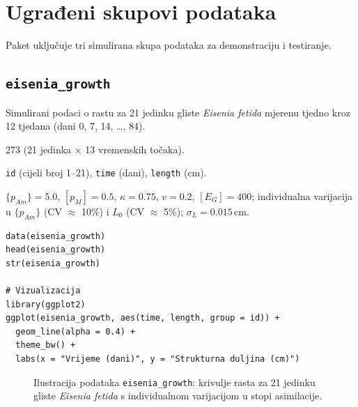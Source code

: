 \documentclass[11pt,a4paper]{article}
\newcommand{\code}[1]{\texttt{#1}}
\begin{document}
\section{Ugrađeni skupovi podataka}
\label{sec:dataseti}

Paket uključuje tri simulirana skupa podataka za demonstraciju i testiranje.

\subsection{\code{eisenia\_growth}}

Simulirani podaci o rastu za 21 jedinku gliste \textit{Eisenia fetida}
mjerenu tjedno kroz 12 tjedana (dani 0, 7, 14, \ldots, 84).

\begin{description}[nosep,leftmargin=3cm]
  \item[Redaka] 273 (21 jedinka $\times$ 13 vremenskih točaka).
  \item[Stupci] \code{id} (cijeli broj 1--21), \code{time} (dani), \code{length} (cm).
  \item[Stvarni parametri] $\{p_{Am}\} = 5.0$, $[p_M] = 0.5$, $\kappa = 0.75$,
    $v = 0.2$, $[E_G] = 400$; individualna varijacija u $\{p_{Am}\}$
    (CV $\approx$ 10\%) i $L_0$ (CV $\approx$ 5\%); $\sigma_L = 0.015$\,cm.
\end{description}

\begin{lstlisting}
data(eisenia_growth)
head(eisenia_growth)
str(eisenia_growth)

# Vizualizacija
library(ggplot2)
ggplot(eisenia_growth, aes(time, length, group = id)) +
  geom_line(alpha = 0.4) +
  theme_bw() +
  labs(x = "Vrijeme (dani)", y = "Strukturna duljina (cm)")
\end{lstlisting}

\begin{figure}[H]
\centering
{}
\caption{Ilustracija podataka \code{eisenia\_growth}: krivulje rasta
  za 21 jedinku gliste \textit{Eisenia fetida} s individualnom
  varijacijom u stopi asimilacije.}
\label{fig:eisenia-podaci}
\end{figure}
\end{document}
